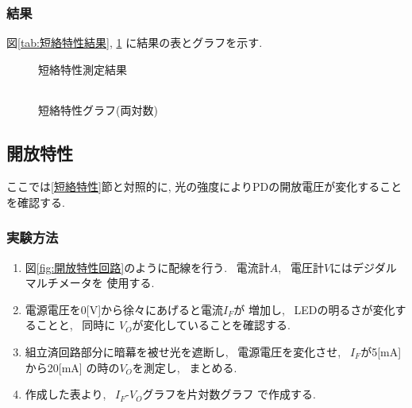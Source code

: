 \documentclass[titlepage]{jsarticle}
\begin{document}
        \subsubsection{結果}
            図\ref{tab:短絡特性結果}, \ref{fig:短絡特性グラフ}
            に結果の表とグラフを示す.

            \begin{figure}[ht]
                \def\@captype{table}
                \begin{minipage}{0.5\hsize}
                    \begin{center}
                        \caption{短絡特性測定結果}
                        \label{tab:短絡特性結果}
                        \begin{tabular}{c|c}
                            
                        \end{tabular}
                    \end{center}
                \end{minipage}
                \begin{minipage}{0.5\hsize}
                    \begin{center}
                        \caption{短絡特性グラフ(両対数)}
                        \label{fig:短絡特性グラフ}
                    \end{center}
                \end{minipage}
            \end{figure}

    \subsection{開放特性}
        ここでは\ref{短絡特性}節と対照的に,
        光の強度によりPDの開放電圧が変化することを確認する.
            
        \subsubsection{実験方法}
            \begin{enumerate}
                \item 図\ref{fig:開放特性回路}のように配線を行う.
                    ~電流計$A$, ~電圧計$V$にはデジダルマルチメータを
                    使用する.
                \item 電源電圧を0[V]から徐々にあげると電流$I_F$が
                    増加し, ~LEDの明るさが変化することと, ~同時に
                    $V_O$が変化していることを確認する.
                \item 組立済回路部分に暗幕を被せ光を遮断し,
                    ~電源電圧を変化させ, ~$I_F$が5[mA]から20[mA]
                    の時の$V_O$を測定し, ~まとめる.
                \item 作成した表より, ~$I_F$-$V_O$グラフを片対数グラフ
                    で作成する.
            \end{enumerate}
\end{document}
